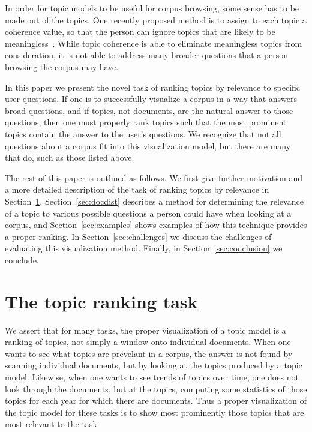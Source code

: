 \documentclass{article}
\newcommand{\secref}[1]{Section~\ref{sec:#1}}
\begin{document}
In order for topic models to be useful for corpus browsing, some sense has to
be made out of the topics.  One recently proposed method is to assign to each
topic a coherence value, so that the person can ignore topics that are likely
to be meaningless~\cite{newman-2010-automatic-evaluation-of-topic-coherence}.
While topic coherence is able to eliminate meaningless topics from
consideration, it is not able to address many broader questions that a person
browsing the corpus may have.

In this paper we present the novel task of ranking topics by relevance to
specific user questions.  If one is to successfully visualize a corpus in a way
that answers broad questions, and if topics, not documents, are the natural
answer to those questions, then one must properly rank topics such that the
most prominent topics contain the answer to the user's questions.  We recognize
that not all questions about a corpus fit into this visualization model, but
there are many that do, such as those listed above.

The rest of this paper is outlined as follows.  We first give further
motivation and a more detailed description of the task of ranking topics by
relevance in \secref{ranking}.  \secref{docdist} describes a method for
determining the relevance of a topic to various possible questions a person
could have when looking at a corpus, and \secref{examples} shows examples of
how this technique provides a proper ranking.  In \secref{challenges} we
discuss the challenges of evaluating this visualization method.  Finally, in
\secref{conclusion} we conclude.

\section{The topic ranking task}
\label{sec:ranking}

We assert that for many tasks, the proper visualization of a topic model is a
ranking of topics, not simply a window onto individual documents.  When one
wants to see what topics are prevelant in a corpus, the answer is not found by
scanning individual documents, but by looking at the topics produced by a topic
model.  Likewise, when one wants to see trends of topics over time, one does
not look through the documents, but at the topics, computing some statistics of
those topics for each year for which there are documents.  Thus a proper
visualization of the topic model for these tasks is to show most prominently
those topics that are most relevant to the task.
\end{document}
